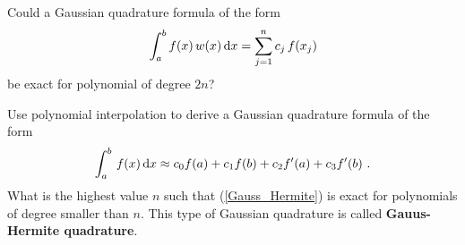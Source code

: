 \begin{question}
Could a Gaussian quadrature formula of the form
\begin{equation}\label{2nQuadrQuestEqu}
\int_a^b f(x)\,w(x) \,\mathrm{d}x = \sum_{j=1}^n c_j \,f(x_j)
\end{equation}
be exact for polynomial of degree $2n$?
\label{diffQ40}
\end{question}

\begin{question}
Use polynomial interpolation to derive a Gaussian quadrature
formula of the form
\begin{equation} \label{Gauss_Hermite}
\int_a^b\,f(x)\,\mathrm{d}x \approx c_0 f(a) + c_1 f(b) + c_2 f'(a) + c_3f'(b) \ .
\end{equation}
What is the highest value $n$ such that (\ref{Gauss_Hermite}) is exact
for polynomials of degree smaller than $n$.  This type of Gaussian
quadrature is called
{\bfseries Gauus-Hermite quadrature}.
\label{diffQ41}
\end{question}



